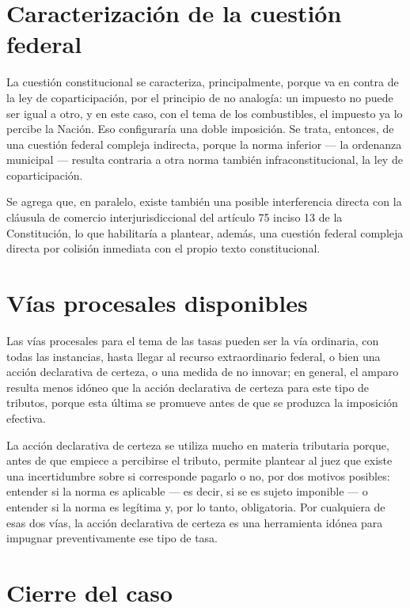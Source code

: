 \documentclass[12pt,oneside]{book}
\begin{document}
\section{Caracterización de la cuestión federal}

La cuestión constitucional se caracteriza, principalmente, porque va en contra de la ley de coparticipación, por el principio de no analogía: un impuesto no puede ser igual a otro, y en este caso, con el tema de los combustibles, el impuesto ya lo percibe la Nación. Eso configuraría una doble imposición. Se trata, entonces, de una cuestión federal compleja indirecta, porque la norma inferior --- la ordenanza municipal --- resulta contraria a otra norma también infraconstitucional, la ley de coparticipación.

Se agrega que, en paralelo, existe también una posible interferencia directa con la cláusula de comercio interjurisdiccional del artículo 75 inciso 13 de la Constitución, lo que habilitaría a plantear, además, una cuestión federal compleja directa por colisión inmediata con el propio texto constitucional.

\section{Vías procesales disponibles}

Las vías procesales para el tema de las tasas pueden ser la vía ordinaria, con todas las instancias, hasta llegar al recurso extraordinario federal, o bien una acción declarativa de certeza, o una medida de no innovar; en general, el amparo resulta menos idóneo que la acción declarativa de certeza para este tipo de tributos, porque esta última se promueve antes de que se produzca la imposición efectiva.

La acción declarativa de certeza se utiliza mucho en materia tributaria porque, antes de que empiece a percibirse el tributo, permite plantear al juez que existe una incertidumbre sobre si corresponde pagarlo o no, por dos motivos posibles: entender si la norma es aplicable --- es decir, si se es sujeto imponible --- o entender si la norma es legítima y, por lo tanto, obligatoria. Por cualquiera de esas dos vías, la acción declarativa de certeza es una herramienta idónea para impugnar preventivamente ese tipo de tasa.

\section{Cierre del caso}
\end{document}
